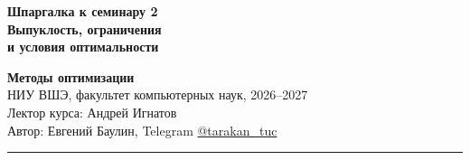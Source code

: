 \documentclass[10pt,a4paper]{article}
\begin{document}
\thispagestyle{fancy}

\noindent
\begin{minipage}[b]{0.6\textwidth}
  \RaggedRight{}
  {\color{hseaccent}\bfseries\small Шпаргалка к семинару 2}\\[1pt]
  {\color{hseblue}\bfseries\Large Выпуклость, ограничения\\ и условия оптимальности}
\end{minipage}\hfill
\begin{minipage}[b]{0.39\textwidth}
  \raggedleft\footnotesize
  {\bfseries Методы оптимизации}\\
  НИУ ВШЭ, факультет компьютерных наук, 2026--2027\\
  Лектор курса: Андрей Игнатов\\
  Автор: Евгений Баулин, Telegram \href{https://t.me/tarakan_tuc}{@tarakan\_tuc}
\end{minipage}

\vspace{2pt}
{\color{hseblue}\rule{\textwidth}{0.8pt}}
\vspace{-4pt}
\end{document}
